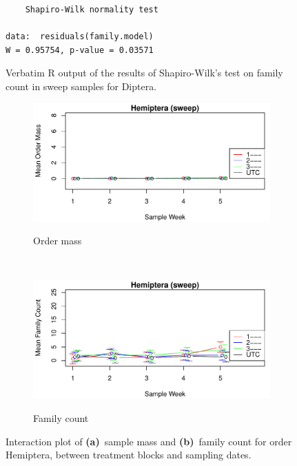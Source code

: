 \documentclass[10pt,letterpaper,twocolumn]{article}
\begin{document}
\begin{figure}[h]
	\lstset{numbers=left}
	\lstset{xleftmargin=5mm,framexleftmargin=5mm}
	\begin{lstlisting}
	Shapiro-Wilk normality test

data:  residuals(family.model)
W = 0.95754, p-value = 0.03571
	\end{lstlisting}
	\caption{Verbatim R output of the results of Shapiro-Wilk's test on family count in sweep samples for Diptera.}
	\label{fig:sweep_diptera_family_shapiro}
	\smallskip
	\nointerlineskip
	\hrulefill
\end{figure}

\begin{figure}[h]
	\centering
	\begin{subfigure}[b]{0.45\textwidth}
		\caption{Order mass}
		\includegraphics[width=\textwidth]{plots/blocks/interaction/mass/mass_sweep_Hemiptera_interplot.pdf}
		\label{fig:sweep_hemiptera_mass_interplot}
	\end{subfigure}
	~
	\begin{subfigure}[b]{0.45\textwidth}
		\caption{Family count}
		\includegraphics[width=\textwidth]{plots/blocks/interaction/family/family_sweep_Hemiptera_interplot.pdf}
		\label{fig:sweep_hemiptera_family_interplot}
	\end{subfigure}
	\caption{Interaction plot of \textbf{(a)}~sample mass and \textbf{(b)}~family count for order Hemiptera, between treatment blocks and sampling dates.}
	\label{fig:sweep_hemiptera_interplot}
	\smallskip
	\nointerlineskip
	\hrulefill
\end{figure}
\end{document}
